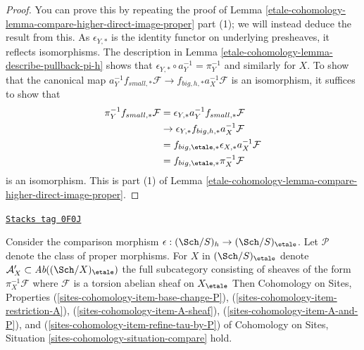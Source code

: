 \begin{proof}
You can prove this by repeating the proof of
Lemma \ref{etale-cohomology-lemma-compare-higher-direct-image-proper} part (1);
we will instead deduce the result from this.
As $\epsilon_{Y, *}$ is the identity functor on underlying presheaves,
it reflects isomorphisms. The description
in Lemma \ref{etale-cohomology-lemma-describe-pullback-pi-h}
shows that $\epsilon_{Y, *} \circ a_Y^{-1} = \pi_Y^{-1}$
and similarly for $X$. To show that the canonical map
$a_Y^{-1}f_{small, *}\mathcal{F} \to f_{big, h, *}a_X^{-1}\mathcal{F}$
is an isomorphism, it suffices to show that
\begin{align*}
\pi_Y^{-1}f_{small, *}\mathcal{F}
& =
\epsilon_{Y, *}a_Y^{-1}f_{small, *}\mathcal{F} \\
& \to
\epsilon_{Y, *}f_{big, h, *}a_X^{-1}\mathcal{F} \\
& =
f_{big, \etale, *} \epsilon_{X, *}a_X^{-1}\mathcal{F} \\
& =
f_{big, \etale, *}\pi_X^{-1}\mathcal{F}
\end{align*}
is an isomorphism. This is part
(1) of Lemma \ref{etale-cohomology-lemma-compare-higher-direct-image-proper}.
\end{proof}

\begin{lemma}
\label{etale-cohomology-lemma-compare-h-etale}
\href{https://stacks.math.columbia.edu/tag/0F0J}{\texttt{Stacks tag 0F0J}}

Consider the comparison morphism $\epsilon : (\Sch/S)_h \to (\Sch/S)_\etale$.
Let $\mathcal{P}$ denote the class of proper morphisms.
For $X$ in $(\Sch/S)_\etale$ denote
$\mathcal{A}'_X \subset \textit{Ab}((\Sch/X)_\etale)$
the full subcategory consisting of sheaves of the form
$\pi_X^{-1}\mathcal{F}$ where $\mathcal{F}$ is a
torsion abelian sheaf on $X_\etale$
Then Cohomology on Sites, Properties
(\ref{sites-cohomology-item-base-change-P}),
(\ref{sites-cohomology-item-restriction-A}),
(\ref{sites-cohomology-item-A-sheaf}),
(\ref{sites-cohomology-item-A-and-P}), and
(\ref{sites-cohomology-item-refine-tau-by-P})
of Cohomology on Sites, Situation
\ref{sites-cohomology-situation-compare} hold.
\end{lemma}


